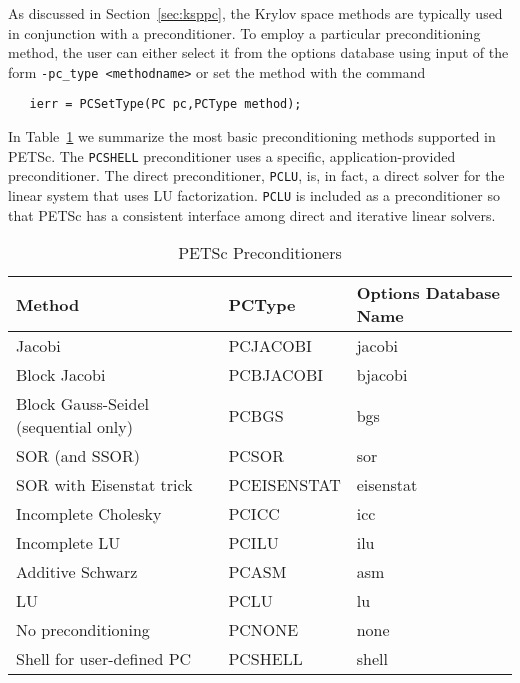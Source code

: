 As discussed in Section~\ref{sec:ksppc}, the Krylov space methods are
typically used in conjunction with a preconditioner.
To employ a particular preconditioning method, the user can either select 
it from the options database using input of the form 
{\tt -pc\_type <methodname>} or set the method with the 
command  
\begin{verbatim}
   ierr = PCSetType(PC pc,PCType method);
\end{verbatim}
In Table~\ref{tab:pcdefaults} we summarize the most basic
preconditioning methods supported in PETSc. 
   
   
The {\tt PCSHELL} preconditioner uses a specific,
application-provided preconditioner.  The direct preconditioner, {\tt PCLU},
is, in fact, a direct solver for the linear system that uses LU
factorization. {\tt PCLU} is included as a preconditioner so that PETSc has a
consistent interface among direct and iterative linear solvers.

\begin{table}
\begin{center}
\begin{tabular}{lll}
{\bf Method}    &{\bf PCType}   & {\bf Options Database Name}\\
\hline
Jacobi                               & PCJACOBI      & jacobi\\
Block Jacobi                         & PCBJACOBI     & bjacobi\\
Block Gauss-Seidel (sequential only) & PCBGS         & bgs\\
SOR (and SSOR)                       & PCSOR         & sor\\
SOR with Eisenstat trick             & PCEISENSTAT   & eisenstat\\
Incomplete Cholesky                  & PCICC         & icc\\
Incomplete LU                        & PCILU         & ilu\\
Additive Schwarz                     & PCASM         & asm\\
\hline
LU                                   & PCLU          & lu\\
No preconditioning                   & PCNONE        & none\\
Shell for user-defined PC            & PCSHELL       & shell\\
\hline
\end{tabular}
\end{center}
\caption{PETSc Preconditioners}
\label{tab:pcdefaults}
\end{table}

